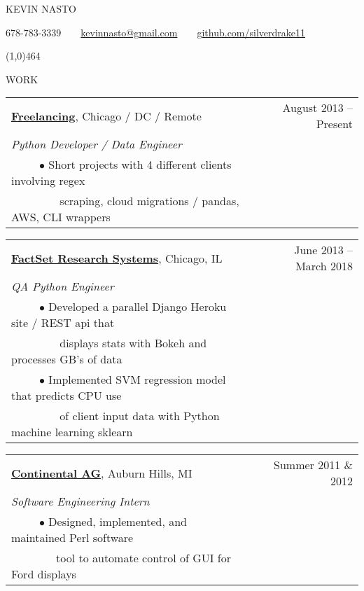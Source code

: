 \documentclass[11pt]{article}
\begin{document}
{\LARGE KEVIN NASTO}

678-78\vphantom{x}3-3339~~\textbullet~~\href{mailto:***REMOVED***}{kevin\vphantom{x}nast\vphantom{x}o@g\vphantom{x}mail.com}~~\textbullet~~\href{https://github.com/silverdrake11/kevinnasto-cv/blob/master/resume.tex}{github.com/silverdrake11}

\line(1,0){464}
\vspace{.8cm}


{WORK}
\vspace{0.4cm}

\begin{tabularx}{\linewidth}{l X r}
\textbf{\href{https://www.factset.com/}{Freelancing}}, Chicago / DC / Remote & & August 2013 -- Present \\
\emph{Python Developer / Data Engineer} \\
~~~~~$\bullet$ Short projects with 4 different clients involving regex \\
~~~~~~~~ scraping, cloud migrations / pandas, AWS, CLI wrappers\\
\end{tabularx}

\vspace{0.4cm}

\begin{tabularx}{\linewidth}{l X r}
\textbf{\href{https://www.factset.com/}{FactSet Research Systems}}, Chicago, IL & & June 2013 -- March 2018 \\
\emph{QA Python Engineer} \\
~~~~~$\bullet$ Developed a parallel Django Heroku site / REST api that\\
~~~~~~~~ displays stats with Bokeh and processes GB's of data \\
~~~~~$\bullet$ Implemented SVM regression model that predicts CPU use \\
~~~~~~~~ of client input data with Python machine learning sklearn\\
\end{tabularx}

\vspace{0.4cm}

\begin{tabularx}{\linewidth}{l X r}
\textbf{\href{https://www.continental-corporation.com/en}{Continental AG}}, Auburn Hills, MI & & Summer 2011 \& 2012 \\
\emph{Software Engineering Intern} \\
~~~~~$\bullet$ Designed, implemented, and maintained Perl software \\
~~~~~~~~tool to automate control of GUI for Ford displays\\
\end{tabularx}
\end{document}
